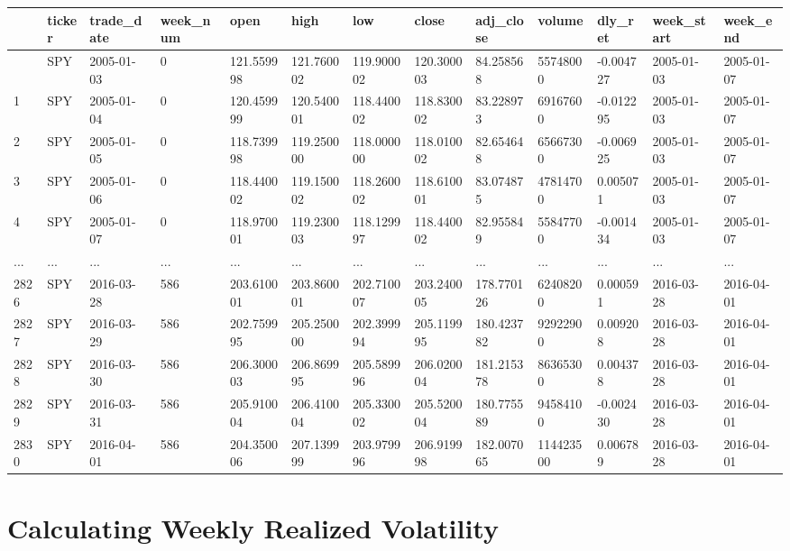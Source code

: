 \documentclass[
  letterpaper,
  DIV=11,
  numbers=noendperiod]{scrreprt}
\begin{document}
\begin{longtable}[]{@{}lllllllllllll@{}}
\toprule\noalign{}
& ticker & trade\_date & week\_num & open & high & low & close &
adj\_close & volume & dly\_ret & week\_start & week\_end \\
\midrule\noalign{}
\endhead
\bottomrule\noalign{}
\endlastfoot
0 & SPY & 2005-01-03 & 0 & 121.559998 & 121.760002 & 119.900002 &
120.300003 & 84.258568 & 55748000 & -0.004727 & 2005-01-03 &
2005-01-07 \\
1 & SPY & 2005-01-04 & 0 & 120.459999 & 120.540001 & 118.440002 &
118.830002 & 83.228973 & 69167600 & -0.012295 & 2005-01-03 &
2005-01-07 \\
2 & SPY & 2005-01-05 & 0 & 118.739998 & 119.250000 & 118.000000 &
118.010002 & 82.654648 & 65667300 & -0.006925 & 2005-01-03 &
2005-01-07 \\
3 & SPY & 2005-01-06 & 0 & 118.440002 & 119.150002 & 118.260002 &
118.610001 & 83.074875 & 47814700 & 0.005071 & 2005-01-03 &
2005-01-07 \\
4 & SPY & 2005-01-07 & 0 & 118.970001 & 119.230003 & 118.129997 &
118.440002 & 82.955849 & 55847700 & -0.001434 & 2005-01-03 &
2005-01-07 \\
... & ... & ... & ... & ... & ... & ... & ... & ... & ... & ... & ... &
... \\
2826 & SPY & 2016-03-28 & 586 & 203.610001 & 203.860001 & 202.710007 &
203.240005 & 178.770126 & 62408200 & 0.000591 & 2016-03-28 &
2016-04-01 \\
2827 & SPY & 2016-03-29 & 586 & 202.759995 & 205.250000 & 202.399994 &
205.119995 & 180.423782 & 92922900 & 0.009208 & 2016-03-28 &
2016-04-01 \\
2828 & SPY & 2016-03-30 & 586 & 206.300003 & 206.869995 & 205.589996 &
206.020004 & 181.215378 & 86365300 & 0.004378 & 2016-03-28 &
2016-04-01 \\
2829 & SPY & 2016-03-31 & 586 & 205.910004 & 206.410004 & 205.330002 &
205.520004 & 180.775589 & 94584100 & -0.002430 & 2016-03-28 &
2016-04-01 \\
2830 & SPY & 2016-04-01 & 586 & 204.350006 & 207.139999 & 203.979996 &
206.919998 & 182.007065 & 114423500 & 0.006789 & 2016-03-28 &
2016-04-01 \\
\end{longtable}

\hypertarget{calculating-weekly-realized-volatility}{%
\section{Calculating Weekly Realized
Volatility}\label{calculating-weekly-realized-volatility}}
\end{document}
